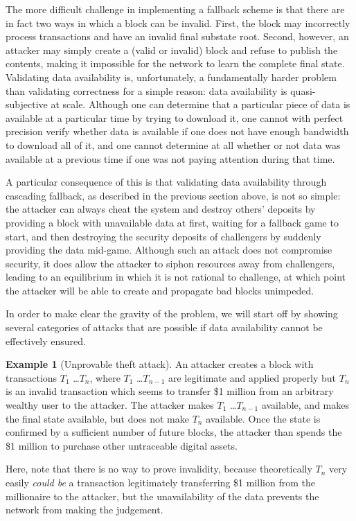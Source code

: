 \documentclass[11pt,a4paper]{report}
\theoremstyle{plain}
\theoremstyle{definition}
\newtheorem{exmp}{Example}[section]
\theoremstyle{remark}
\begin{document}
The more difficult challenge in implementing a fallback scheme is that there are in fact two ways in which a block can be invalid. First, the block may incorrectly process transactions and have an invalid final substate root. Second, however, an attacker may simply create a (valid or invalid) block and refuse to publish the contents, making it impossible for the network to learn the complete final state. Validating data availability is, unfortunately, a fundamentally harder problem than validating correctness for a simple reason: data availability is quasi-subjective at scale. Although one can determine that a particular piece of data is available at a particular time by trying to download it, one cannot with perfect precision verify whether data is available if one does not have enough bandwidth to download all of it, and one cannot determine at all whether or not data was available at a previous time if one was not paying attention during that time.

A particular consequence of this is that validating data availability through cascading fallback, as described in the previous section above, is not so simple: the attacker can always cheat the system and destroy others' deposits by providing a block with unavailable data at first, waiting for a fallback game to start, and then destroying the security deposits of challengers by suddenly providing the data mid-game. Although such an attack does not compromise security, it does allow the attacker to siphon resources away from challengers, leading to an equilibrium in which it is not rational to challenge, at which point the attacker will be able to create and propagate bad blocks unimpeded.

In order to make clear the gravity of the problem, we will start off by showing several categories of attacks that are possible if data availability cannot be effectively ensured.

\begin{exmp}[Unprovable theft attack]
An attacker creates a block with transactions $T_1$ \ldots $T_n$, where $T_1$ \ldots $T_{n-1}$ are legitimate and applied properly but $T_n$ is an invalid transaction which seems to transfer \$1 million from an arbitrary wealthy user to the attacker. The attacker makes $T_1$ \ldots $T_{n-1}$ available, and makes the final state available, but does not make $T_n$ available. Once the state is confirmed by a sufficient number of future blocks, the attacker than spends the \$1 million to purchase other untraceable digital assets.

Here, note that there is no way to prove invalidity, because theoretically $T_n$ very easily \emph{could be} a transaction legitimately transferring \$1 million from the millionaire to the attacker, but the unavailability of the data prevents the network from making the judgement.
\end{exmp}
\end{document}
